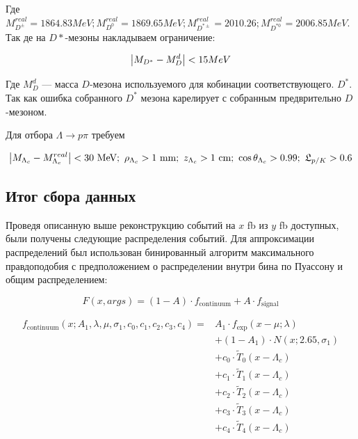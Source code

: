 Где $M^{real}_{D^\pm} = 1864.83 MeV; M^{real}_{D^0} = 1869.65 MeV; 
M^{real}_{D^{*\pm}} = 2010.26;  M^{real}_{D^{*0}} = 2006.85 MeV$. 
Так де на $D*$-мезоны накладываем ограничение:

\begin{equation}
        \abs{M_{D^*} - M^d_{D}} < 15 MeV
\end{equation}

Где $ M^d_{D}$ --- масса $D$-мезона используемого для кобинации соответствующего. 
$D^*$. Так как ошибка собранного $D^*$ мезона карелирует с собранным 
предврительно $D$-мезоном.

\newdot Для отбора $\Lambda \to p \pi$ требуем 

$$
\abs{ M_{\Lambda_c} - M^{real}_{\Lambda_c} } < 30 \text{ MeV}; 
\ \rho_{\Lambda_c} > 1 \text{ mm}; \ z_{\Lambda_c} > 1 \text{ cm}; 
\ \cos \theta_{\Lambda_c} > 0.99;
\ \mathfrak{L}_{p/K } > 0.6 
$$


\subsection{Итог сбора данных}

Проведя описанную выше реконструкцию событий на $x$ fb из $y$ fb доступных, были получены 
следующие распределения событий. Для аппроксимации распределений был использован 
бинированный алгоритм максимального правдоподобия с предположением о распределении внутри 
бина по Пуассону и общим распределением:

\begin{equation}
    F(x, args) = (1-A)\cdot f_{\text{continuum}} + A \cdot f_{\text{signal}}
\end{equation}

\begin{equation}
    \begin{split}
    f_{\text{continuum}}(x; A_1, \lambda, \mu, \sigma_1, c_0, c_1, c_2, c_3, c_4) = & A_1 \cdot f_{\text{exp}}(x - \mu; \lambda) \\
    & + (1 - A_1) \cdot N(x; 2.65, \sigma_1) \\
    & + c_0 \cdot \tilde T_0(x - \Lambda_c) \\
    & + c_1 \cdot \tilde T_1(x - \Lambda_c) \\
    & + c_2 \cdot \tilde T_2(x - \Lambda_c) \\
    & + c_3 \cdot \tilde T_3(x - \Lambda_c) \\
    & + c_4 \cdot \tilde T_4(x - \Lambda_c)
    \end{split}
\end{equation}
    

